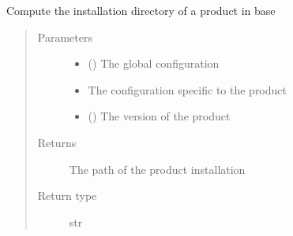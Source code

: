 \documentclass[a4paper,10pt,english]{sphinxmanual}
\begin{document}

\begin{fulllineitems}
\label{\detokenize{commands/apidoc/src:src.product.get_base_install_dir}}
Compute the installation directory of a product in base
\begin{quote}\begin{description}
\item[{Parameters}] \leavevmode\begin{itemize}
\item {} 
 () \textendash{} The global configuration

\item {} 
 \textendash{} The configuration specific to 
the product

\item {} 
 () \textendash{} The version of the product

\end{itemize}

\item[{Returns}] \leavevmode
The path of the product installation

\item[{Return type}] \leavevmode
str

\end{description}\end{quote}

\end{fulllineitems}

\end{document}
